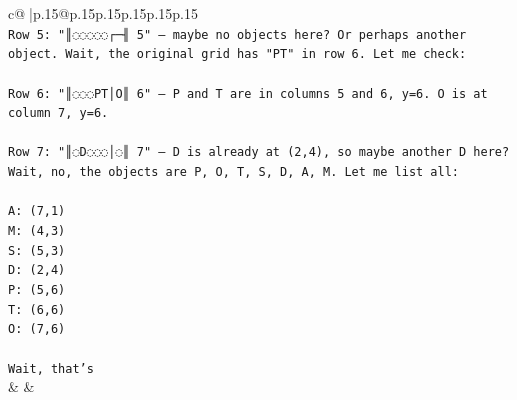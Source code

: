 \documentclass{article}
\begin{document}
{\begin{supertabular}{c@{$\;$}|p{.15\linewidth}@{}p{.15\linewidth}p{.15\linewidth}p{.15\linewidth}p{.15\linewidth}p{.15\linewidth}}
{{{\\ 
\texttt{Row 5: "║◌◌◌◌◌┌─╢ 5" – maybe no objects here? Or perhaps another object. Wait, the original grid has "PT" in row 6. Let me check:} \\
\\ 
\texttt{Row 6: "║◌◌◌PT│O║ 6" – P and T are in columns 5 and 6, y=6. O is at column 7, y=6.} \\
\\ 
\texttt{Row 7: "║◌D◌◌◌│◌║ 7" – D is already at (2,4), so maybe another D here? Wait, no, the objects are P, O, T, S, D, A, M. Let me list all:} \\
\\ 
\texttt{A: (7,1)} \\
\texttt{M: (4,3)} \\
\texttt{S: (5,3)} \\
\texttt{D: (2,4)} \\
\texttt{P: (5,6)} \\
\texttt{T: (6,6)} \\
\texttt{O: (7,6)} \\
\\ 
\texttt{Wait, that's} \\
            }
        }
    }
    & & \\ \\


\end{supertabular}}
\end{document}
